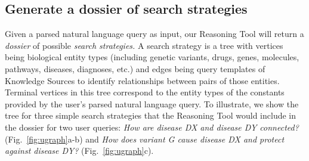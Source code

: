 \documentclass[11pt,notitlepage]{article}
\begin{document}
\subsection{Generate a dossier of search strategies}
\label{section:strategies}
Given a parsed natural language query as input, our Reasoning Tool will return
a {\em dossier\/} of possible {\em search strategies.\/} A search
strategy is a tree with vertices being biological entity types (including genetic
variants, drugs, genes, molecules, pathways, diseases, diagnoses,
etc.) and edges being query templates of Knowledge Sources to identify
relationships between pairs of those entities.
Terminal vertices in this tree correspond to
the entity types of the constants provided by the user's parsed natural language
query. To illustrate, we show the tree for three simple search strategies that
the Reasoning Tool would include in the dossier for two user queries: {\em How
  are disease DX and disease DY connected?\/} (Fig.~\ref{fig:ugraph}a-b) and
{\em How does variant G cause disease DX and protect against disease DY?\/}
(Fig.~\ref{fig:ugraph}c).
\end{document}
